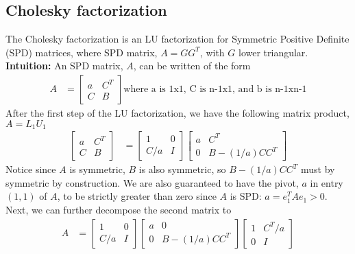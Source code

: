 \documentclass{article}
\begin{document}
\subsection{Cholesky factorization}
The Cholesky factorization is an LU factorization for Symmetric Positive Definite (SPD) matrices, where SPD matrix, $A = GG^T$, with $G$ lower triangular.\\
\textbf{Intuition:} An SPD matrix, $A$, can be written of the form
\begin{align*}
    A &= \begin{bmatrix} a & C^T\\ C &  B \end{bmatrix} \textrm{where a is 1x1, C is n-1x1, and b is n-1xn-1}
\end{align*}
After the first step of the LU factorization, we have the following matrix product, $A = L_1U_1$
\begin{align*}
    \begin{bmatrix} a & C^T\\ C &  B \end{bmatrix} &= 
    \begin{bmatrix} 1 & 0\\ C/a &  I \end{bmatrix} 
    \begin{bmatrix} a & C^T\\ 0 & B - (1/a)CC^T \end{bmatrix}
\end{align*}
Notice since $A$ is symmetric, $B$ is also symmetric, so $B - (1/a)CC^T$ must by symmetric by construction. We are also guaranteed to have the pivot, $a$ in entry $(1,1)$ of $A$, to be strictly greater than zero since $A$ is SPD: $a = e_1^TAe_1 > 0$. Next, we can further decompose the second matrix to
\begin{align*}
    A &= \begin{bmatrix} 1 & 0\\ C/a &  I\end{bmatrix}
    \begin{bmatrix} a & 0\\ 0 & B - (1/a)CC^T \end{bmatrix}
    \begin{bmatrix} 1 & C^T/a\\ 0 & I \end{bmatrix}
\end{align*}
\end{document}
